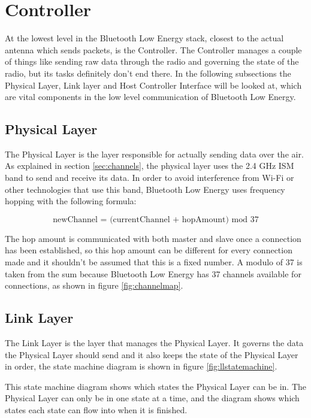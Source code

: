 \documentclass[pdftex,a4paper,12pt,twoside]{report}
\begin{document}
\newpage{}

\section{Controller}
\label{sec:stackController}
At the lowest level in the Bluetooth Low Energy stack, closest to the actual antenna which sends packets, is the Controller. The Controller manages a couple of things like sending raw data through the radio and governing the state of the radio, but its tasks definitely don't end there. In the following subsections the Physical Layer, Link layer and Host Controller Interface will be looked at, which are vital components in the low level communication of Bluetooth Low Energy.

\subsection{Physical Layer}
\label{subsec:controllerPHY}
The Physical Layer is the layer responsible for actually sending data over the air. As explained in section \ref{sec:channels}, the physical layer uses the 2.4 GHz ISM band to send and receive its data. In order to avoid interference from Wi-Fi or other technologies that use this band, Bluetooth Low Energy uses frequency hopping with the following formula:

\begin{equation*}
\text{newChannel = (currentChannel + hopAmount) mod 37}
\end{equation*}

The hop amount is communicated with both master and slave once a connection has been established, so this hop amount can be different for every connection made and it shouldn't be assumed that this is a fixed number. A modulo of 37 is taken from the sum because Bluetooth Low Energy has 37 channels available for connections, as shown in figure \ref{fig:channelmap}.

\subsection{Link Layer}
\label{subsec:controllerLL}
The Link Layer is the layer that manages the Physical Layer. It governs the data the Physical Layer should send and it also keeps the state of the Physical Layer in order, the state machine diagram is shown in figure \ref{fig:llstatemachine}. 

This state machine diagram shows which states the Physical Layer can be in. The Physical Layer can only be in one state at a time, and the diagram shows which states each state can flow into when it is finished.
\end{document}
